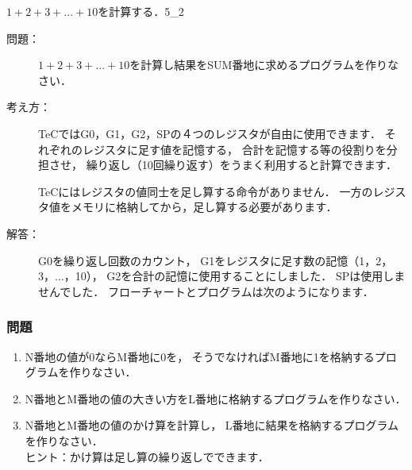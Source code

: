 \newpage
\begin{reidai}{$1 + 2 + 3 + ... + 10$を計算する．}{5_2}
  \begin{description}
  \item[問題：]
    $1 + 2 + 3 + ... + 10$を計算し結果をSUM番地に求めるプログラムを作りなさい．

  \item[考え方：]
    TeCではG0，G1，G2，SPの４つのレジスタが自由に使用できます．
    それぞれのレジスタに足す値を記憶する，
    合計を記憶する等の役割りを分担させ，
    繰り返し（10回繰り返す）をうまく利用すると計算できます．

    TeCにはレジスタの値同士を足し算する命令がありません．
    一方のレジスタ値をメモリに格納してから，足し算する必要があります．

  \item[解答：]
    G0を繰り返し回数のカウント，
    G1をレジスタに足す数の記憶（1，2，3，...，10），
    G2を合計の記憶に使用することにしました．
    SPは使用しませんでした．
    フローチャートとプログラムは次のようになります．

    \begin{center}
    \end{center}
  \end{description}
\end{reidai}

\vfill
\subsubsection{問題}
\begin{enumerate}
\item N番地の値が0ならM番地に0を，
  そうでなければM番地に1を格納するプログラムを作りなさい．
\item N番地とM番地の値の大きい方をL番地に格納するプログラムを作りなさい．
\item N番地とM番地の値のかけ算を計算し，
  L番地に結果を格納するプログラムを作りなさい．\\
  ヒント：かけ算は足し算の繰り返しでできます．
\end{enumerate}
\vfill

